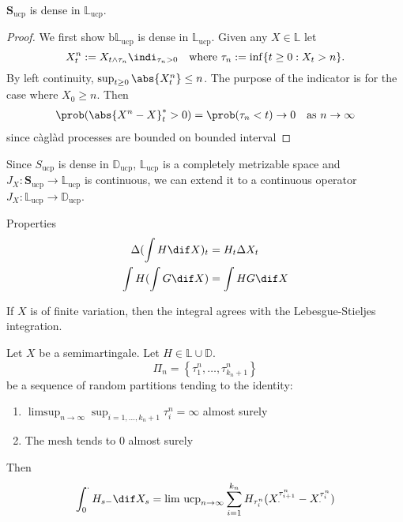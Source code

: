 \documentclass{scrreprt}
\theoremstyle{remark}
\newcommand{\caglad}{c\`agl\`ad}
\newcommand{\simpro}{\mathbf S}
\newcommand{\cadspace}{\mathbb D}
\newcommand{\cagspace}{\mathbb L}
\newcommand{\ucp}{\text{ucp}}
\newcommand{\bdd}{\text{b}}
\newcommand\defeq{:=}
\begin{document}
\begin{theorem}
	$\simpro_{\ucp}$ is dense in $\cagspace_{\ucp}$.
\end{theorem}
\begin{proof}
	We first show $\bdd \cagspace_{\ucp}$ is dense in $\cagspace_{\ucp}$. Given any $X \in \cagspace$ let
	\begin{equation}
		X^n_t \defeq X_{t \wedge \tau_n} \indi_{\tau_n > 0} \quad \text{where}\ \tau_n := \inf \{t \geq 0 : X_t > n\}.
	\end{equation}
	By left continuity, $\sup_{t \geq 0} \abs{X^n_t} \leq n$. The purpose of the indicator is for the case where $X_0 \geq n$. Then
	\begin{align}
		\prob(\abs{X^n - X}^*_t > 0)
		= \prob(\tau_n < t) \to 0 \quad \text{as $n \to \infty$}
	\end{align}
	since \caglad{} processes are bounded on bounded interval
\end{proof}

Since $S_{\ucp}$ is dense in $\cadspace_{\ucp}$, $\cagspace_{\ucp}$ is a completely metrizable space and $J_X: \simpro_{\ucp} \to \cagspace_{\ucp}$ is continuous, we can extend it to a continuous operator $J_X: \cagspace_{\ucp} \to \cadspace_{\ucp}$.

Properties
\begin{align}
	\Delta(\int H \dif X)_t &= H_t \Delta X_t \\
	\int H (\int G \dif X) &= \int HG \dif X
\end{align}

\begin{theorem}
	If $X$ is of finite variation, then the integral agrees with the Lebesgue-Stieljes integration.
\end{theorem}

\begin{theorem}
	Let $X$ be a semimartingale. Let $H \in \cagspace \cup \cadspace$.
	\begin{equation}
		\Pi_n = \left\{ \tau_1^n, \ldots, \tau_{k_n+1}^n \right\}
	\end{equation}
	be a sequence of random partitions tending to the identity:
	\begin{enumerate}
		\item $\limsup_{n \to \infty} \sup_{i = 1, \ldots, k_n + 1} \tau^n_i = \infty$ almost surely
		\item The mesh tends to 0 almost surely
	\end{enumerate}
	Then
	\begin{equation}
		\int_0^{\cdot} H_{s-} \dif X_s =
		\text{lim ucp}_{n \to \infty}
		\sum_{i=1}^{k_n} H_{\tau^n_i}(X^{\tau^n_{i+1}}_{\cdot} - X^{\tau^n_i}_{\cdot})
	\end{equation}
\end{theorem}
\end{document}
